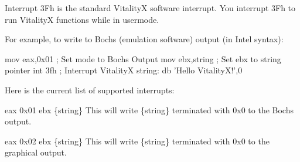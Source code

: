 Interrupt 3\+Fh is the standard VitalityX software interrupt. You interrupt 3\+Fh to run VitalityX functions while in usermode.

For example, to write to Bochs (emulation software) output (in Intel syntax)\+: 
\begin{DoxyCode}
        mov eax,0x01 ; Set mode to Bochs Output
        mov ebx,string ; Set ebx to string pointer
        int 3fh ; Interrupt VitalityX
string: db 'Hello VitalityX!',0
\end{DoxyCode}


Here is the current list of supported interrupts\+:

eax 0x01 ebx \{string\} This will write \{string\} terminated with 0x0 to the Bochs output.

eax 0x02 ebx \{string\} This will write \{string\} terminated with 0x0 to the graphical output. 